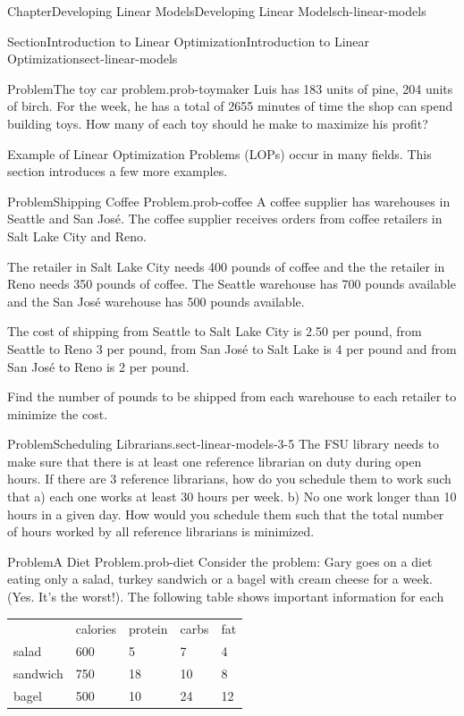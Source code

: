 \documentclass[oneside,10pt,]{book}
\newcommand{\tabularfont}{\relax}
\numberwithin{equation}{section}
\newcommand{\hrulemedium}{\noalign{\hrule height 0.07em}}
\begin{document}
\begin{chapterptx}{Chapter}{Developing Linear Models}{}{Developing Linear Models}{}{}{ch-linear-models}
\begin{sectionptx}{Section}{Introduction to Linear Optimization}{}{Introduction to Linear Optimization}{}{}{sect-linear-models}
\begin{introduction}{}
\begin{problem}{Problem}{The toy car problem.}{prob-toymaker}
Luis has 183 units of pine, 204 units of birch. For the week, he has a total of 2655 minutes of time the shop can spend building toys. How many of each toy should he make to maximize his profit?%
\end{problem}
Example of Linear Optimization Problems (LOPs) occur in many fields. This section introduces a few more examples.%
\begin{problem}{Problem}{Shipping Coffee Problem.}{prob-coffee}%
A coffee supplier has warehouses in Seattle and San José. The coffee supplier receives orders from coffee retailers in Salt Lake City and Reno.%
\par
The retailer in Salt Lake City needs 400 pounds of coffee and the the retailer in Reno needs 350 pounds of coffee. The Seattle warehouse has 700 pounds available and the San José warehouse has 500 pounds available.%
\par
The cost of shipping from Seattle to Salt Lake City is \textdollar{}2.50 per pound, from Seattle to Reno \textdollar{}3 per pound, from San José to Salt Lake is \textdollar{}4 per pound and from San José to Reno is \textdollar{}2 per pound.%
\par
Find the number of pounds to be shipped from each warehouse to each retailer to minimize the cost.%
\end{problem}
\begin{problem}{Problem}{Scheduling Librarians.}{sect-linear-models-3-5}%
The FSU library needs to make sure that there is at least one reference librarian on duty during open hours. If there are 3 reference librarians, how do you schedule them to work such that a) each one works at least 30 hours per week. b) No one work longer than 10 hours in a given day. How would you schedule them such that the total number of hours worked by all reference librarians is minimized.%
\end{problem}
\begin{problem}{Problem}{A Diet Problem.}{prob-diet}%
Consider the problem: Gary goes on a diet eating only a salad, turkey sandwich or a bagel with cream cheese for a week. (Yes. It’s the worst!). The following table shows important information for each%
\begin{center}%
{\tabularfont%
\begin{tabular}{lllll}
&calories&protein&carbs&fat\tabularnewline\hrulemedium
salad&600&5&7&4\tabularnewline[0pt]
sandwich&750&18&10&8\tabularnewline[0pt]
bagel&500&10&24&12
\end{tabular}
}%
\end{center}%

\end{problem}
\end{introduction}
\end{sectionptx}
\end{chapterptx}
\end{document}
